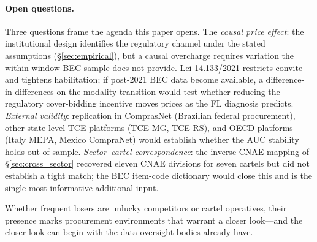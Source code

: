\paragraph{Open questions.}
Three questions frame the agenda this paper opens. The
\emph{causal price effect}: the institutional design
identifies the regulatory channel under the stated assumptions
(\S\ref{sec:empirical}), but a causal overcharge requires
variation the within-window BEC sample does not provide. Lei
14.133/2021 restricts convite and tightens habilitation; if
post-2021 BEC data become available, a difference-in-differences
on the modality transition would test whether reducing the
regulatory cover-bidding incentive moves prices as the FL
diagnosis predicts. \emph{External validity}: replication in
ComprasNet (Brazilian federal procurement), other state-level
TCE platforms (TCE-MG, TCE-RS), and OECD platforms (Italy
MEPA, Mexico CompraNet) would establish whether the AUC
stability holds out-of-sample. \emph{Sector--cartel
correspondence}: the inverse CNAE mapping of
\S\ref{sec:cross_sector} recovered eleven CNAE divisions for
seven cartels but did not establish a tight match; the BEC
item-code dictionary would close this and is the single most
informative additional input.

Whether frequent losers are unlucky competitors or cartel
operatives, their presence marks procurement environments that
warrant a closer look---and the closer look can begin with the
data oversight bodies already have.
